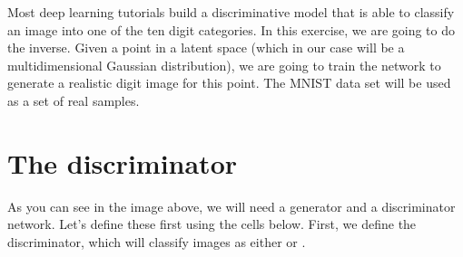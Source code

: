 \documentclass[letterpaper,10pt,english]{jupyterBook}
\begin{document}
\sphinxAtStartPar
Most deep learning tutorials build a discriminative model that is able to classify an image into one of the ten digit categories. In this exercise, we are going to do the inverse. Given a point in a latent space (which in our case will be a multi\sphinxhyphen{}dimensional Gaussian distribution), we are going to train the network to generate a realistic digit image for this point. The MNIST data set will be used as a set of real samples.




\section{The discriminator}
\label{\detokenize{notebooks/Tutorial4_Generative_Models/Tutorial4_Generative_Models_student:the-discriminator}}
\sphinxAtStartPar
As you can see in the image above, we will need a generator and a discriminator network. Let’s define these first using the cells below. First, we define the discriminator, which will classify images as either  or .
\end{document}
